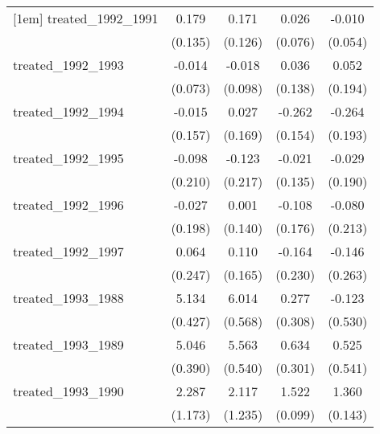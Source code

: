 {\begin{tabular}{l*{4}{c}}
[1em]
treated\_1992\_1991&       0.179         &       0.171         &       0.026         &      -0.010         \\
            &     (0.135)         &     (0.126)         &     (0.076)         &     (0.054)         \\
[1em]
treated\_1992\_1993&      -0.014         &      -0.018         &       0.036         &       0.052         \\
            &     (0.073)         &     (0.098)         &     (0.138)         &     (0.194)         \\
[1em]
treated\_1992\_1994&      -0.015         &       0.027         &      -0.262         &      -0.264         \\
            &     (0.157)         &     (0.169)         &     (0.154)         &     (0.193)         \\
[1em]
treated\_1992\_1995&      -0.098         &      -0.123         &      -0.021         &      -0.029         \\
            &     (0.210)         &     (0.217)         &     (0.135)         &     (0.190)         \\
[1em]
treated\_1992\_1996&      -0.027         &       0.001         &      -0.108         &      -0.080         \\
            &     (0.198)         &     (0.140)         &     (0.176)         &     (0.213)         \\
[1em]
treated\_1992\_1997&       0.064         &       0.110         &      -0.164         &      -0.146         \\
            &     (0.247)         &     (0.165)         &     (0.230)         &     (0.263)         \\
[1em]
treated\_1993\_1988&       5.134\sym{***}&       6.014\sym{***}&       0.277         &      -0.123         \\
            &     (0.427)         &     (0.568)         &     (0.308)         &     (0.530)         \\
[1em]
treated\_1993\_1989&       5.046\sym{***}&       5.563\sym{***}&       0.634\sym{*}  &       0.525         \\
            &     (0.390)         &     (0.540)         &     (0.301)         &     (0.541)         \\
[1em]
treated\_1993\_1990&       2.287         &       2.117         &       1.522\sym{***}&       1.360\sym{***}\\
            &     (1.173)         &     (1.235)         &     (0.099)         &     (0.143)         \\

\end{tabular}}
